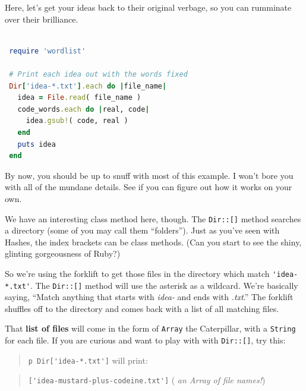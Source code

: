 \documentclass[10pt,twoside]{report}
\begin{document}
Here, let's get your ideas back to their original verbage, so you can
rumminate over their brilliance.


\begin{lstlisting}[basicstyle=\ttfamily\color{basiccolor},
    commentstyle = \ttfamily\color{commentcolor},
    keywordstyle=\ttfamily\color{keywordscolor},
    stringstyle=\color{stringcolor},
    language=Ruby,
    basicstyle=\small\ttfamily,
    showstringspaces=false,
  ]

 require 'wordlist'

 # Print each idea out with the words fixed
 Dir['idea-*.txt'].each do |file_name|
   idea = File.read( file_name )
   code_words.each do |real, code|
     idea.gsub!( code, real )
   end
   puts idea
 end

\end{lstlisting}

By now, you should be up to snuff with most of this example.  I won't
bore you with all of the mundane details.  See if you can figure out
how it works on your own.

We have an interesting class method here, though.  The
\lstinline[breaklines=true]|Dir::[]| method searches a directory (some
of you may call them ``folders'').  Just as you've seen with Hashes,
the index brackets can be class methods.  (Can you start to see the
shiny, glinting gorgeousness of Ruby?)

So we're using the forklift to get those files in the directory which
match \lstinline[breaklines=true]|'idea-*.txt'|.  The
\lstinline[breaklines=true]|Dir::[]| method will use the asterisk as a
wildcard.  We're basically saying, ``Match anything that starts with
{\em idea-} and ends with {\em .txt}.''  The forklift shuffles off to
the directory and comes back with a list of all matching files.

That {\bf list of files} will come in the form of
\lstinline[breaklines=true]|Array| the Caterpillar, with a
\lstinline[breaklines=true]|String| for each file.  If you are curious
and want to play with with \lstinline[breaklines=true]|Dir::[]|, try
this:

\begin{quote}
\lstinline[breaklines=true]|p Dir['idea-*.txt']| will
print:\end{quote}


\begin{quote}
\lstinline[breaklines=true]|['idea-mustard-plus-codeine.txt']| ({\em
  an Array of file names!})\end{quote}
\end{document}
